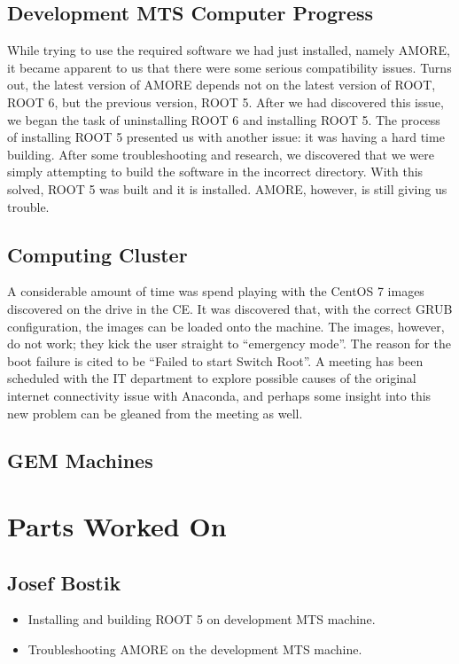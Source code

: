 \documentclass[12pt]{article}
\newcommand\tab[1][1cm]{\hspace*{#1}}
\begin{document}
\subsection{Development MTS Computer Progress}

\tab While trying to use the required software we had just installed, namely
AMORE, it became apparent to us that there were some serious compatibility
issues. Turns out, the latest version of AMORE depends not on the latest version
of ROOT, ROOT 6, but the previous version, ROOT 5. After we had discovered this
issue, we began the task of uninstalling ROOT 6 and installing ROOT 5. The
process of installing ROOT 5 presented us with another issue: it was having a
hard time building. After some troubleshooting and research, we discovered that
we were simply attempting to build the software in the incorrect directory. With
this solved, ROOT 5 was built and it is installed. AMORE, however, is still
giving us trouble.

\subsection{Computing Cluster}

\tab A considerable amount of time was spend playing with the CentOS 7 images
discovered on the drive in the CE. It was discovered that, with the correct GRUB
configuration, the images can be loaded onto the machine. The images, however,
do not work; they kick the user straight to ``emergency mode''. The reason for
the boot failure is cited to be ``Failed to start Switch Root''. A meeting has
been scheduled with the IT department to explore possible causes of the original
internet connectivity issue with Anaconda, and perhaps some insight into this
new problem can be gleaned from the meeting as well.

\subsection{GEM Machines}


\section{Parts Worked On}

\subsection{Josef Bostik}

\begin{itemize}
\item Installing and building ROOT 5 on development MTS machine.
\item Troubleshooting AMORE on the development MTS machine.
\end{itemize}
\end{document}
